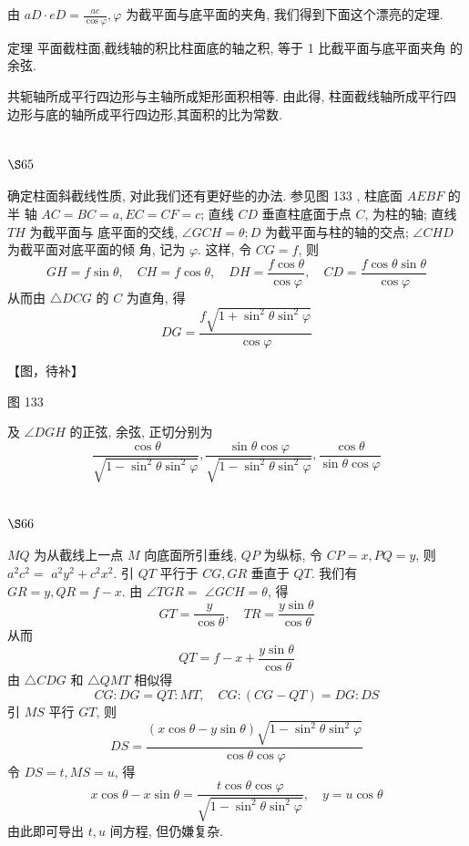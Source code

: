 由 $a D \cdot e D=\frac{a c}{\cos \varphi}, \varphi$ 为截平面与底平面的夹角, 我们得到下面这个漂亮的定理.

定理 平面截柱面,截线轴的积比柱面底的轴之积, 等于 1 比截平面与底平面夹角 的余弦.

共轭轴所成平行四边形与主轴所成矩形面积相等. 由此得, 柱面截线轴所成平行四 边形与底的轴所成平行四边形,其面积的比为常数.

\section{$\S 65$}

确定柱面斜截线性质, 对此我们还有更好些的办法. 参见图 133 , 柱底面 $A E B F$ 的半 轴 $A C=B C=a, E C=C F=c$; 直线 $C D$ 垂直柱底面于点 $C$, 为柱的轴; 直线 $T H$ 为截平面与 底平面的交线, $\angle G C H=\theta ; D$ 为截平面与柱的轴的交点; $\angle C H D$ 为截平面对底平面的倾 角, 记为 $\varphi$. 这样, 令 $C G=f$, 则
\[
G H=f \sin \theta, \quad C H=f \cos \theta, \quad D H=\frac{f \cos \theta}{\cos \varphi}, \quad C D=\frac{f \cos \theta \sin \theta}{\cos \varphi}
\]
从而由 $\triangle D C G$ 的 $C$ 为直角, 得
\[
D G=\frac{f \sqrt{1+\sin ^2 \theta \sin ^2 \varphi}}{\cos \varphi}
\]

【图，待补】

图 133 

及 $\angle D G H$ 的正弦, 余弦, 正切分别为
\[
\frac{\cos \theta}{\sqrt{1-\sin ^{2} \theta \sin ^{2} \varphi}}, \frac{\sin \theta \cos \varphi}{\sqrt{1-\sin ^{2} \theta \sin ^{2} \varphi}}, \frac{\cos \theta}{\sin \theta \cos \varphi}
\]
\section{$\S 66$}

$M Q$ 为从截线上一点 $M$ 向底面所引垂线, $Q P$ 为纵标, 令 $C P=x, P Q=y$, 则 $a^{2} c^{2}=$ $a^{2} y^{2}+c^{2} x^{2}$. 引 $Q T$ 平行于 $C G, G R$ 垂直于 $Q T$. 我们有 $G R=y, Q R=f-x$. 由 $\angle T G R=$ $\angle G C H=\theta$, 得
\[
G T=\frac{y}{\cos \theta}, \quad T R=\frac{y \sin \theta}{\cos \theta}
\]
从而
\[
Q T=f-x+\frac{y \sin \theta}{\cos \theta}
\]
由 $\triangle C D G$ 和 $\triangle Q M T$ 相似得
\[
C G: D G=Q T: M T, \quad C G:(C G-Q T)=D G: D S
\]
引 $M S$ 平行 $G T$, 则
\[
D S=\frac{(x \cos \theta-y \sin \theta) \sqrt{1-\sin ^{2} \theta \sin ^{2} \varphi}}{\cos \theta \cos \varphi}
\]
令 $D S=t, M S=u$, 得
\[
x \cos \theta-x \sin \theta=\frac{t \cos \theta \cos \varphi}{\sqrt{1-\sin ^{2} \theta \sin ^{2} \varphi}}, \quad y=u \cos \theta
\]
由此即可导出 $t, u$ 间方程, 但仍嫌复杂.

